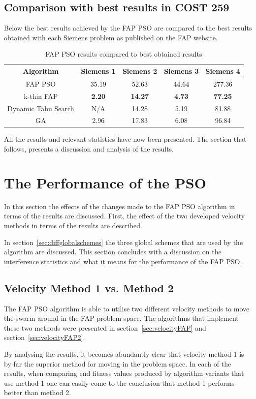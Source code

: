\subsection{Comparison with best results in COST 259}
Below the best results achieved by the FAP PSO are compared to the best results obtained with each Siemens problem as published on the FAP website\cite{FAPWeb}.
\begin{table}[H]
\centering
\begin{tabular}{ccccc}
	\toprule
	Algorithm & Siemens 1 & Siemens 2 & Siemens 3 & Siemens 4 \\
    \midrule
	FAP PSO & 35.19 & 52.63 & 44.64 & 277.36 \\ 
	k-thin FAP & \textbf{2.20} & \textbf{14.27} & \textbf{4.73} & \textbf{77.25} \\ 
    Dynamic Tabu Search & \scriptsize{N/A} & 14.28 & 5.19 & 81.88 \\
	GA & 2.96 & 17.83 & 6.08 & 96.84 \\
    \bottomrule
	\end{tabular}
\caption{FAP PSO results compared to best obtained results}
\label{tab:allbest}
\end{table}


All the results and relevant statistics have now been presented. The section that follows, presents a discussion and analysis of the results.
\section{The Performance of the PSO}
In this section the effects of the changes made to the FAP PSO algorithm in terms of the results are discussed. First, the effect of the two developed velocity methods in terms of the results are described. 

In section~\ref{sec:diffglobalschemes} the three global schemes that are used by the algorithm are discussed. This section concludes with a discussion on the interference statistics and what it means for the performance of the FAP PSO.
\subsection{Velocity Method 1 vs. Method 2}
The FAP PSO algorithm is able to utilise two different velocity methods to move the swarm around in the FAP problem space. The algorithms that implement these two methods were presented in section~\ref{sec:velocityFAP} and section~\ref{sec:velocityFAP2}.

By analysing the results, it becomes abundantly clear that velocity method 1 is by far the superior method for moving in the problem space. In each of the results, when comparing end fitness values produced by algorithm variants that use method 1 one can easily come to the conclusion that method 1 performs better than method 2.

